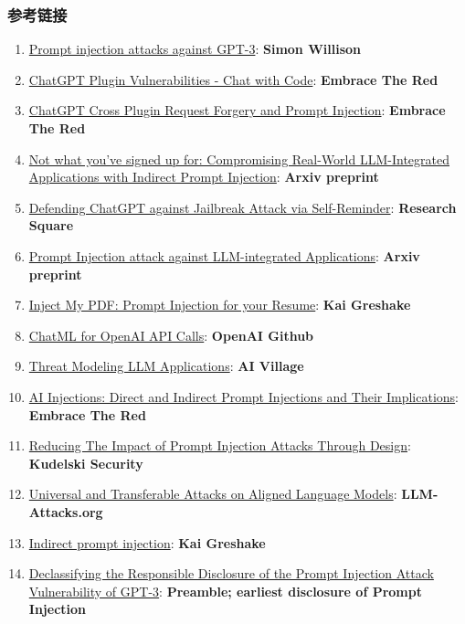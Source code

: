\documentclass[
]{article}
\providecommand{\tightlist}{%
  \setlength{\itemsep}{0pt}\setlength{\parskip}{0pt}}
\begin{document}
\subsubsection{参考链接}\label{ux53c2ux8003ux94feux63a5}

\begin{enumerate}
\def\labelenumi{\arabic{enumi}.}
\tightlist
\item
  \href{https://simonwillison.net/2022/Sep/12/prompt-injection/}{Prompt
  injection attacks against GPT-3}: \textbf{Simon Willison}
\item
  \href{https://embracethered.com/blog/posts/2023/chatgpt-plugin-vulns-chat-with-code/}{ChatGPT
  Plugin Vulnerabilities - Chat with Code}: \textbf{Embrace The Red}
\item
  \href{https://embracethered.com/blog/posts/2023/chatgpt-cross-plugin-request-forgery-and-prompt-injection./}{ChatGPT
  Cross Plugin Request Forgery and Prompt Injection}: \textbf{Embrace
  The Red}
\item
  \href{https://arxiv.org/pdf/2302.12173.pdf}{Not what you've signed up
  for: Compromising Real-World LLM-Integrated Applications with Indirect
  Prompt Injection}: \textbf{Arxiv preprint}
\item
  \href{https://www.researchsquare.com/article/rs-2873090/v1}{Defending
  ChatGPT against Jailbreak Attack via Self-Reminder}: \textbf{Research
  Square}
\item
  \href{https://arxiv.org/abs/2306.05499}{Prompt Injection attack
  against LLM-integrated Applications}: \textbf{Arxiv preprint}
\item
  \href{https://kai-greshake.de/posts/inject-my-pdf/}{Inject My PDF:
  Prompt Injection for your Resume}: \textbf{Kai Greshake}
\item
  \href{https://github.com/openai/openai-python/blob/main/chatml.md}{ChatML
  for OpenAI API Calls}: \textbf{OpenAI Github}
\item
  \href{http://aivillage.org/large\%20language\%20models/threat-modeling-llm/}{Threat
  Modeling LLM Applications}: \textbf{AI Village}
\item
  \href{https://embracethered.com/blog/posts/2023/ai-injections-direct-and-indirect-prompt-injection-basics/}{AI
  Injections: Direct and Indirect Prompt Injections and Their
  Implications}: \textbf{Embrace The Red}
\item
  \href{https://research.kudelskisecurity.com/2023/05/25/reducing-the-impact-of-prompt-injection-attacks-through-design/}{Reducing
  The Impact of Prompt Injection Attacks Through Design}:
  \textbf{Kudelski Security}
\item
  \href{https://llm-attacks.org/}{Universal and Transferable Attacks on
  Aligned Language Models}: \textbf{LLM-Attacks.org}
\item
  \href{https://kai-greshake.de/posts/llm-malware/}{Indirect prompt
  injection}: \textbf{Kai Greshake}
\item
  \href{https://www.preamble.com/prompt-injection-a-critical-vulnerability-in-the-gpt-3-transformer-and-how-we-can-begin-to-solve-it}{Declassifying
  the Responsible Disclosure of the Prompt Injection Attack
  Vulnerability of GPT-3}: \textbf{Preamble; earliest disclosure of
  Prompt Injection}
\end{enumerate}
\end{document}
